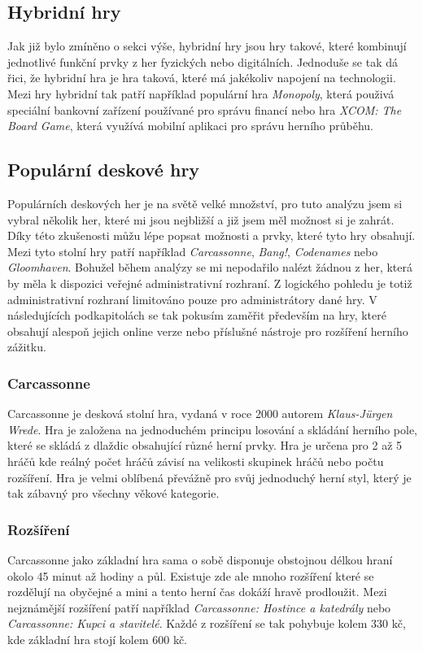 \subsection*{Hybridní hry}
\label{subsec:popular-board-games-analysis-hybrid-games}
Jak již bylo zmíněno o sekci výše, hybridní hry jsou hry takové, které kombinují jednotlivé funkční prvky z her fyzických nebo digitálních. Jednoduše se tak dá řici, že hybridní hra je hra taková, které má jakékoliv napojení na technologii. Mezi hry hybridní tak patří například populární hra \textit{Monopoly}, která použivá speciální bankovní zařízení používané pro správu financí nebo hra \textit{XCOM: The Board Game}, která využívá mobilní aplikaci pro správu herního průběhu.

\subsection{Populární deskové hry}
\label{subsec:popular-board-games-analysis-popular-games}
Populárních deskových her je na světě velké množství, pro tuto analýzu jsem si vybral několik her, které mi jsou nejbližší a již jsem měl možnost si je zahrát. Díky této zkušenosti můžu lépe popsat možnosti a prvky, které tyto hry obsahují. Mezi tyto stolní hry patří například \textit{Carcassonne}, \textit{Bang!}, \textit{Codenames} nebo \textit{Gloomhaven}. Bohužel během analýzy se mi nepodařilo nalézt žádnou z her, která by měla k dispozici veřejné administrativní rozhraní. Z logického pohledu je totiž administrativní rozhraní limitováno pouze pro administrátory dané hry. V následujících podkapitolách se tak pokusím zaměřit především na hry, které obsahují alespoň jejich online verze nebo příslušné nástroje pro rozšíření herního zážitku.

\subsubsection{Carcassonne}
\label{subsubsec:popular-board-games-analysis-carcassonne}
Carcassonne je desková stolní hra, vydaná v roce 2000 autorem \textit{Klaus-Jürgen Wrede}. Hra je založena na jednoduchém principu losování a skládání herního pole, které se skládá z dlaždic obsahující různé herní prvky. Hra je určena pro 2 až 5 hráčů kde reálný počet hráčů závisí na velikosti skupinek hráčů nebo počtu rozšíření. Hra je velmi oblíbená převážně pro svůj jednoduchý herní styl, který je tak zábavný pro všechny věkové kategorie.

\subsubsection*{Rozšíření}
\label{subsubsec:popular-board-games-analysis-carcassonne-expansions}
Carcassonne jako základní hra sama o sobě disponuje obstojnou délkou hraní okolo 45 minut až hodiny a půl. Existuje zde ale mnoho rozšíření které se rozdělují na obyčejné a mini a tento herní čas dokáží hravě prodloužit. Mezi nejznámější rozšíření patří například \textit{Carcassonne: Hostince a katedrály} nebo \textit{Carcassonne: Kupci a stavitelé}. Každé z rozšíření se tak pohybuje kolem 330 kč, kde základní hra stojí kolem 600 kč.

